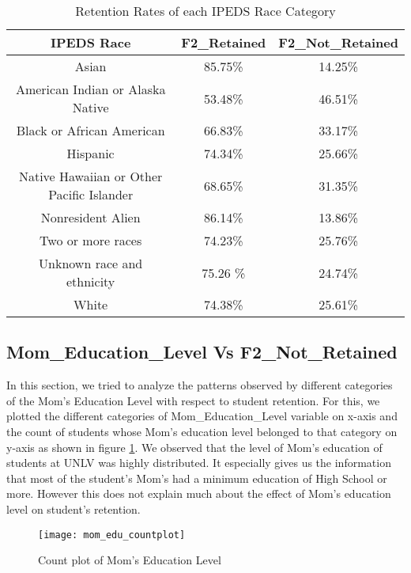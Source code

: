 \documentclass[11pt,openright]{report}
\begin{document}
 \begin{table}[!t]
	\renewcommand{\arraystretch}{1.3}
	\caption{Retention Rates of each IPEDS Race Category}
	\label{table:ipeds_race_retentions}
	\centering
	\begin{tabular}{|c|c|c|}
		\hline
		\bfseries IPEDS Race & \bfseries F2\_Retained & \bfseries F2\_Not\_Retained\\
		\hline
		Asian & 85.75\% & 14.25\% \\ \hline
		American Indian or Alaska Native & 53.48\% & 46.51\% \\ \hline
		Black or African American & 66.83\% & 33.17\% \\ \hline
		Hispanic & 74.34\% & 25.66\% \\ \hline
		Native Hawaiian or Other Pacific Islander & 68.65\% & 31.35\% \\ \hline
		Nonresident Alien & 86.14\% & 13.86\% \\ \hline
		Two or more races &  74.23\% &  25.76\% \\ \hline
		Unknown race and ethnicity & 75.26 \% & 24.74\% \\ \hline
		White & 74.38\% & 25.61\% \\ \hline
	\end{tabular}
\end{table}



\subsection {Mom\_Education\_Level Vs F2\_Not\_Retained}
In this section, we tried to analyze the patterns observed by different categories of the Mom's Education Level with respect to student retention. For this, we plotted the different categories of Mom\_Education\_Level variable on x-axis and the count of students whose Mom's education level belonged to that category on y-axis as shown in figure \ref{fig:mom_edu_F2NotRetained_plot}. We observed that the level of Mom's education of students at UNLV was highly distributed. It especially gives us the information that most of the student's Mom's had a minimum education of High School or more. However this does not explain much about the effect of Mom's education level on student's retention.

\begin{figure}[!ht]
	\centering
	\texttt{[image: mom\_edu\_countplot]}
	\caption{Count plot of Mom's Education Level}
	\label{fig:mom_edu_F2NotRetained_plot}
\end{figure}
\end{document}
